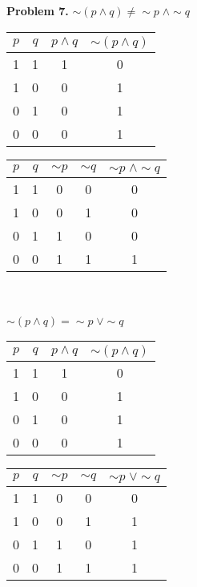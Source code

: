 \documentclass[a4paper,12pt]{article}
\newenvironment{problem}[1]{\par\bigskip\noindent\textbf{Problem #1.} \newline}{}
\begin{document}
  \begin{problem}{7}
    $\sim (p \wedge q) \not= \sim p \; \wedge \sim q$
    \begin{tabular}{|c|c|c|c|}
      \hline          
      $p$ & $q$ & $p \wedge q$ & $\sim(p \wedge q)$\\
      \hline  
      1&1&1&0\\
      \hline  
      1&0&0&1\\
      \hline
      0&1&0&1\\
      \hline
      0&0&0&1\\
      \hline
    \end{tabular}
    \begin{tabular}{|c|c|c|c|c|}
      \hline          
      $p$ & $q$ & $\sim p$ & $\sim q$ & $\sim p \; \wedge \sim q$\\
      \hline  
      1&1&0&0&0\\
      \hline  
      1&0&0&1&0\\
      \hline
      0&1&1&0&0\\
      \hline
      0&0&1&1&1\\
      \hline
    \end{tabular}\\\\
    
    $\sim (p \wedge q) = \sim p \; \vee \sim q$
    \begin{tabular}{|c|c|c|c|}
      \hline          
      $p$ & $q$ & $p \wedge q$ & $\sim(p \wedge q)$\\
      \hline  
      1&1&1&0\\
      \hline  
      1&0&0&1\\
      \hline
      0&1&0&1\\
      \hline
      0&0&0&1\\
      \hline
    \end{tabular}
    \begin{tabular}{|c|c|c|c|c|}
      \hline          
      $p$ & $q$ & $\sim p$ & $\sim q$ & $\sim p \; \vee \sim q$\\
      \hline  
      1&1&0&0&0\\
      \hline  
      1&0&0&1&1\\
      \hline
      0&1&1&0&1\\
      \hline
      0&0&1&1&1\\
      \hline
    \end{tabular}\\\\

  \end{problem}
\end{document}
